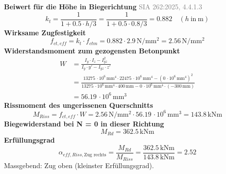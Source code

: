 \documentclass[11pt,a4paper]{article}
\newcommand{\normref}[1]{{\small\textcolor{gray}{#1}}}
\begin{document}
\noindent\textbf{Beiwert für die Höhe in Biegerichtung} \hfill \normref{SIA 262:2025, 4.4.1.3}
\begin{equation*}
k_t = \frac{1}{1 + 0.5 \cdot h/3} = \frac{1}{1 + 0.5 \cdot 0.8/3} = 0.882 \quad \left(h\ \text{in}\ \mathrm{m}\right)
\end{equation*}
\noindent\textbf{Wirksame Zugfestigkeit}
\begin{equation*}
f_{ct,eff} = k_t \cdot f_{ctm} = 0.882 \cdot 2.9\,\mathrm{N}/\mathrm{mm}^{2} = 2.56\,\mathrm{N}/\mathrm{mm}^{2}
\end{equation*}
\noindent\textbf{Widerstandsmoment zum gezogensten Betonpunkt}
\begin{equation*}
\begin{aligned}
  W &= \frac{I_y \cdot I_z - I_{yz}^{2}}{I_y \cdot y' - I_{yz} \cdot z'} \\
  &= \frac{13275\,\cdot 10^{6}\,\mathrm{mm}^{4} \cdot 22475\,\cdot 10^{6}\,\mathrm{mm}^{4} - \left(0\,\cdot 10^{6}\,\mathrm{mm}^{4}\right)^{2}}{13275\,\cdot 10^{6}\,\mathrm{mm}^{4} \cdot 400\,\mathrm{mm} - 0\,\cdot 10^{6}\,\mathrm{mm}^{4} \cdot \left(-300\,\mathrm{mm}\right)} \\
  &= 56.19\,\cdot 10^{6}\,\mathrm{mm}^{3}
\end{aligned}
\end{equation*}
\noindent\textbf{Rissmoment des ungerissenen Querschnitts}
\begin{equation*}
M_{Riss} = f_{ct,eff} \cdot W = 2.56\,\mathrm{N}/\mathrm{mm}^{2} \cdot 56.19\,\cdot 10^{6}\,\mathrm{mm}^{3} = 143.8\,\mathrm{kNm}
\end{equation*}
\noindent\textbf{Biegewiderstand bei N = 0 in dieser Richtung}
\begin{equation*}
M_{Rd} = 362.5\,\mathrm{kNm}
\end{equation*}
\noindent\textbf{Erfüllungsgrad}
\begin{equation*}
\alpha_{eff,Riss,\text{Zug rechts}} = \frac{M_{Rd}}{M_{Riss}} = \frac{362.5\,\mathrm{kNm}}{143.8\,\mathrm{kNm}} = 2.52
\end{equation*}
Massgebend: Zug oben (kleinster Erfüllungsgrad).
\end{document}
